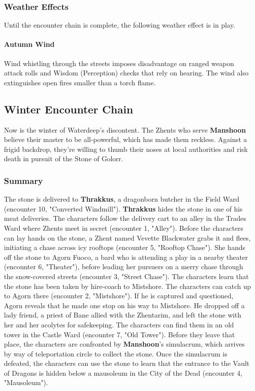 \documentclass[10pt,a4paper,twoside,twocolumn,openany,nodeprecatedcode]{dndbook}
\begin{document}
\subsubsection{Weather Effects}
Until the encounter chain is complete, the following weather effect is in play.
\paragraph{Autumn Wind}
Wind whistling through the streets imposes disadvantage on ranged weapon attack rolls and Wisdom (Perception) checks that rely on hearing. The wind also extinguishes open fires smaller than a torch flame.
\subsection{Winter Encounter Chain}
Now is the winter of Waterdeep's discontent. The Zhents who serve \textbf{Manshoon} believe their master to be all-powerful, which has made them reckless. Against a frigid backdrop, they're willing to thumb their noses at local authorities and risk death in pursuit of the Stone of Golorr.
\subsubsection{Summary}
The stone is delivered to \textbf{Thrakkus}, a dragonborn butcher in the Field Ward (encounter 10, "Converted Windmill"). \textbf{Thrakkus} hides the stone in one of his meat deliveries. The characters follow the delivery cart to an alley in the Trades Ward where Zhents meet in secret (encounter 1, "Alley"). Before the characters can lay hands on the stone, a Zhent named Vevette Blackwater grabs it and flees, initiating a chase across icy rooftops (encounter 5, "Rooftop Chase"). She hands off the stone to Agorn Fuoco, a bard who is attending a play in a nearby theater (encounter 6, "Theater"), before leading her pursuers on a merry chase through the snow-covered streets (encounter 3, "Street Chase"). The characters learn that the stone has been taken by hire-coach to Mistshore. The characters can catch up to Agorn there (encounter 2, "Mistshore").
If he is captured and questioned, Agorn reveals that he made one stop on his way to Mistshore. He dropped off a lady friend, a priest of Bane allied with the Zhentarim, and left the stone with her and her acolytes for safekeeping. The characters can find them in an old tower in the Castle Ward (encounter 7, "Old Tower"). Before they leave that place, the characters are confronted by \textbf{Manshoon}'s simulacrum, which arrives by way of teleportation circle to collect the stone. Once the simulacrum is defeated, the characters can use the stone to learn that the entrance to the Vault of Dragons is hidden below a mausoleum in the City of the Dead (encounter 4, "Mausoleum").
\end{document}
